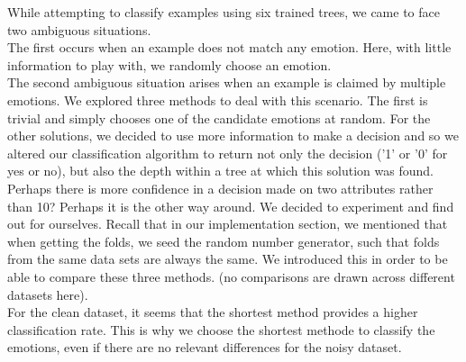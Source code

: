 While attempting to classify examples using six trained trees, we came to face two ambiguous situations.\\
The first occurs when an example does not match any emotion.
Here, with little information to play with, we randomly choose an emotion.\\
The second ambiguous situation arises when an example is claimed by multiple emotions.
We explored three methods to deal with this scenario.
The first is trivial and simply chooses one of the candidate emotions at random.
For the other solutions, we decided to use more information to make a decision and so we altered our classification algorithm
to return not only the decision ('1' or '0' for yes or no), but also the depth within a tree at which this solution was found.
Perhaps there is more confidence in a decision made on two attributes rather than 10? Perhaps it is the other way around.
We decided to experiment and find out for ourselves. Recall that in our implementation section, we mentioned that when getting
the folds, we seed the random number generator, such that folds from the same data sets are always the same. We introduced this
in order to be able to compare these three methods. (no comparisons are drawn across different datasets here).\\




For the clean dataset, it seems that the shortest method provides a higher classification rate.
This is why we choose the shortest methode to classify the emotions, even if there are no relevant differences for the noisy dataset.




